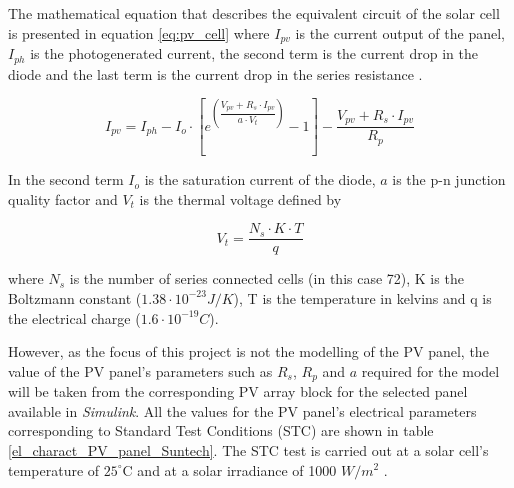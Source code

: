 The mathematical equation that describes the equivalent circuit of the solar cell is presented in equation \ref{eq:pv_cell}  where $I_{pv}$ is the current output of the panel, $I_{ph}$ is the photogenerated current, the second term is the current drop in the diode and the last term is the current drop in the series resistance . 

\begin{equation} \label{eq:pv_cell}
I_{pv} = I_{ph} - I_{o} \cdot \left[ e^{\left({\dfrac{V_{pv} + R_s\cdot I_{pv}}{a \cdot V_{t}}}\right)}  - 1 \right]  - \dfrac{V_{pv} + R_{s}\cdot I_{pv}}{R_{p}}
\end{equation}

In the second term $I_{o}$ is the saturation current of the diode, $a$ is the p-n junction quality factor  and $V_{t}$ is the thermal voltage defined by

\begin{equation} 
V_{t}=\dfrac{N_{s}\cdot K\cdot T}{q} 
\end{equation}

where $N_{s}$ is the number of series connected cells (in this case 72), K is the Boltzmann constant ($1.38 \cdot 10^{-23} J/K$), T is the temperature in kelvins and q is the electrical charge ($1.6 \cdot 10^{-19} C$).

However, as the focus of this project is not the modelling of the PV panel, the value of the PV panel's parameters such as $R_{s}$, $R_{p}$ and $a$ required for the model will be taken from the corresponding PV array block for the selected panel available in \textit{Simulink}. All the values for the PV panel's electrical parameters corresponding to Standard Test Conditions (STC) are shown in table \ref{el_charact_PV_panel_Suntech}. The STC test is carried out at a solar cell's temperature of $25^\circ$C and at a solar irradiance of 1000 $W/ m^2$ \cite{handbook}.

